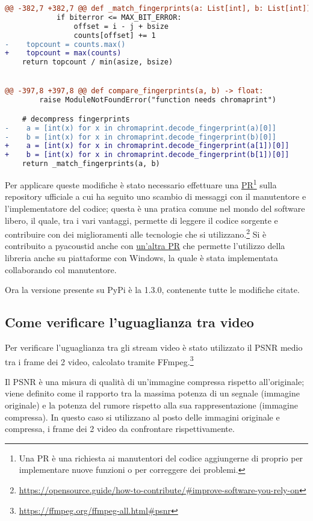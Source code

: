 \begin{lstlisting}[language=diff]
@@ -382,7 +382,7 @@ def _match_fingerprints(a: List[int], b: List[int]) -> float:
            if biterror <= MAX_BIT_ERROR:
                offset = i - j + bsize
                counts[offset] += 1
-    topcount = counts.max()
+    topcount = max(counts)
    return topcount / min(asize, bsize)


@@ -397,8 +397,8 @@ def compare_fingerprints(a, b) -> float:
        raise ModuleNotFoundError("function needs chromaprint")

    # decompress fingerprints
-    a = [int(x) for x in chromaprint.decode_fingerprint(a)[0]]
-    b = [int(x) for x in chromaprint.decode_fingerprint(b)[0]]
+    a = [int(x) for x in chromaprint.decode_fingerprint(a[1])[0]]
+    b = [int(x) for x in chromaprint.decode_fingerprint(b[1])[0]]
    return _match_fingerprints(a, b)
\end{lstlisting}

Per applicare queste modifiche è stato necessario effettuare una \href{https://github.com/beetbox/pyacoustid/pull/78}{\ac{PR}}\footnote{Una \ac{PR} è una richiesta ai manutentori del codice aggiungerne di proprio per implementare nuove funzioni o per correggere dei problemi.} sulla repository ufficiale a cui ha seguito uno scambio di messaggi con il manutentore e l'implementatore del codice; questa è una pratica comune nel mondo del software libero, il quale, tra i vari vantaggi, permette di leggere il codice sorgente e contribuire con dei miglioramenti alle tecnologie che si utilizzano.\footnote{\url{https://opensource.guide/how-to-contribute/#improve-software-you-rely-on}}
Si è contribuito a pyacoustid anche con \href{https://github.com/beetbox/pyacoustid/pull/79}{un'altra \ac{PR}} che permette l'utilizzo della libreria anche su piattaforme con Windows, la quale è stata implementata collaborando col manutentore.

Ora la versione presente su PyPi è la 1.3.0, contenente tutte le modifiche citate.


\subsection{Come verificare l'uguaglianza tra video}  %
Per verificare l'uguaglianza tra gli stream video è stato utilizzato il \ac{PSNR} medio tra i frame dei 2 video, calcolato tramite FFmpeg.\footnote{\url{https://ffmpeg.org/ffmpeg-all.html#psnr}}

Il \ac{PSNR} è una misura di qualità di un'immagine compressa rispetto all'originale; viene definito come il rapporto tra la massima potenza di un segnale (immagine originale) e la potenza del rumore rispetto alla sua rappresentazione (immagine compressa).
In questo caso si utilizzano al posto delle immagini originale e compressa, i frame dei 2 video da confrontare rispettivamente.

